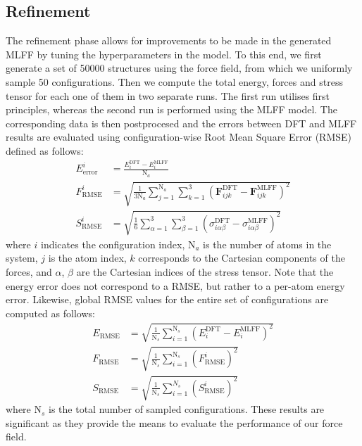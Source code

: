 \subsection{Refinement}
The refinement phase allows for improvements to be made in the generated MLFF by tuning the hyperparameters in the model. To this end, we first generate a set of 50000 structures using the force field, from which we uniformly sample 50 configurations. Then we compute the total energy, forces and stress tensor for each one of them in two separate runs. The first run utilises first principles, whereas the second run is performed using the MLFF model. The corresponding data is then postprocesed and the errors between DFT and MLFF results are evaluated using configuration-wise Root Mean Square Error (RMSE) defined as follows:
\begin{subequations}
    \label{eq:rmse_per_conf}
    \begin{align}
        \label{eq:energy_error}
        E^i_{\text{error}} &= \frac{E_i^{\text{DFT}} - E_i^{\text{MLFF}}}{\text{N}_{a}} \\
        \label{eq:force_error}
        F^i_{\text{RMSE}} &= \sqrt{\frac{1}{3\text{N}_{a}}\sum_{j=1}^{\text{N}_{a}}\sum_{k=1}^{3} \left(\mathbf{F}_{ijk}^{\text{DFT}} - \mathbf{F}_{ijk}^{\text{MLFF}}\right)^2} \\
        \label{eq:stress_error}
        S^i_{\text{RMSE}} &= \sqrt{\frac{1}{6} \sum_{\alpha=1}^{3}\sum_{\beta=1}^{3} \left(\sigma_{i\alpha\beta}^{\text{DFT}} - \sigma_{i\alpha\beta}^{\text{MLFF}}\right)^2}
    \end{align}
\end{subequations}
where $i$ indicates the configuration index, $\text{N}_a$ is the number of atoms in the system, $j$ is the atom index, $k$ corresponds to the Cartesian components of the forces, and $\alpha$, $\beta$ are the Cartesian indices of the stress tensor. Note that the energy error does not correspond to a RMSE, but rather to a per-atom energy error. Likewise, global RMSE values for the entire set of configurations are computed as follows:
\begin{subequations}
    \label{eq:rmse_global}
    \begin{align}
        \label{eq:rmse_e}
        E_{\text{RMSE}} &= \sqrt{\frac{1}{\text{N}_s}\sum_{i=1}^{\text{N}_s} \left(E_i^{\text{DFT}} - E_i^{\text{MLFF}}\right)^2} \\
        \label{eq:rmse_f}
        F_{\text{RMSE}} &= \sqrt{\frac{1}{\text{N}_{s}} \sum_{i=1}^{\text{N}_{s}} \left(F^i_{\text{RMSE}} \right)^2} \\
        \label{eq:rmse_s}
        S_{\text{RMSE}} &= \sqrt{\frac{1}{\text{N}_s} \sum_{i=1}^{N_s} \left(S^i_{\text{RMSE}} \right)^2}
    \end{align}
\end{subequations}
where $\text{N}_s$ is the total number of sampled configurations. These results are significant as they provide the means to evaluate the performance of our force field.

